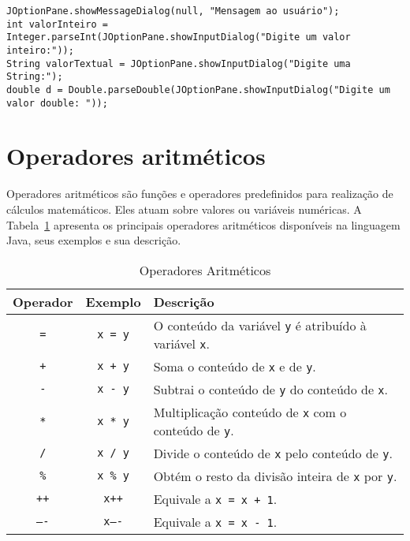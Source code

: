 \begin{verbatim}
JOptionPane.showMessageDialog(null, "Mensagem ao usuário");
int valorInteiro = Integer.parseInt(JOptionPane.showInputDialog("Digite um valor inteiro:"));
String valorTextual = JOptionPane.showInputDialog("Digite uma String:");
double d = Double.parseDouble(JOptionPane.showInputDialog("Digite um valor double: "));
\end{verbatim}


\section{Operadores aritméticos}

Operadores aritméticos são funções e operadores predefinidos para realização de cálculos matemáticos. Eles atuam sobre valores ou variáveis numéricas. A Tabela~\ref{tab:operadores-aritmeticos} apresenta os principais operadores aritméticos disponíveis na linguagem Java, seus exemplos e sua descrição.

\begin{table}[H]
	\centering
	\begin{tabular}{c|c|l}
		\hline
		\textbf{Operador} & \textbf{Exemplo} & \textbf{Descrição}\\ \hline
		\texttt{=}   	 & \texttt{x = y}	   & O conteúdo da variável \texttt{y} é atribuído à variável \texttt{x}.  \\
		\texttt{+} 		 & \texttt{x + y}     & Soma o conteúdo de \texttt{x} e de \texttt{y}.\\
		\texttt{-}  		 & \texttt{x - y}     & Subtrai o conteúdo de \texttt{y} do conteúdo de \texttt{x}.\\
		\texttt{*}  		 & \texttt{x * y}     & Multiplicação conteúdo de \texttt{x} com o conteúdo de \texttt{y}.\\
		\texttt{/}  		 & \texttt{x / y}     & Divide o conteúdo de \texttt{x} pelo conteúdo de \texttt{y}.\\
		\texttt{\%} 		 & \texttt{x \% y} & Obtém o resto da divisão inteira de \texttt{x} por \texttt{y}.\\
		\texttt{++}  	 & \texttt{x++}     & Equivale a \texttt{x = x + 1}.\\
		\texttt{----}  	 & \texttt{x----}     & Equivale a \texttt{x = x - 1}.\\ \hline                           
	\end{tabular}
	\caption{Operadores Aritméticos}
	\label{tab:operadores-aritmeticos}
\end{table}

